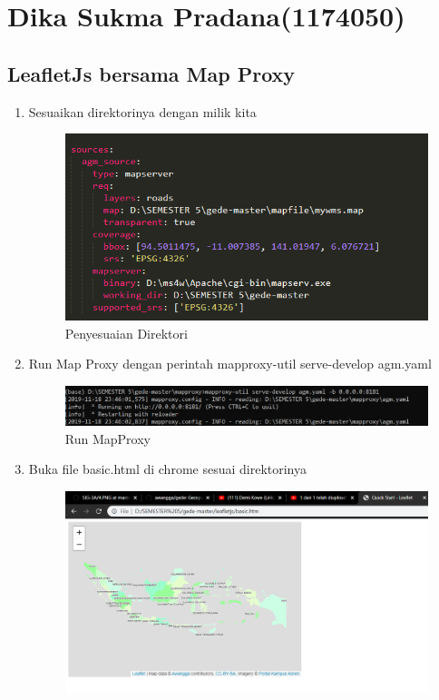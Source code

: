 \section{Dika Sukma Pradana(1174050)}
\subsection{LeafletJs bersama Map Proxy}
\begin{enumerate}
 \item Sesuaikan direktorinya dengan milik kita
    \hfill\break
    \begin{figure}[H]
		\includegraphics[width=12cm]{figures/1174050/tugas5/2.PNG}
		\centering
		\caption{Penyesuaian Direktori}
	\end{figure}
    \item Run Map Proxy dengan perintah mapproxy-util serve-develop agm.yaml
    \hfill\break
    \begin{figure}[H]
		\includegraphics[width=12cm]{figures/1174050/tugas5/1.PNG}
		\centering
		\caption{Run MapProxy}
	\end{figure}
    \item Buka file basic.html di chrome sesuai direktorinya
    \hfill\break
    \begin{figure}[H]
		\includegraphics[width=12cm]{figures/1174050/tugas5/3.PNG}

\end{figure}
\end{enumerate}
